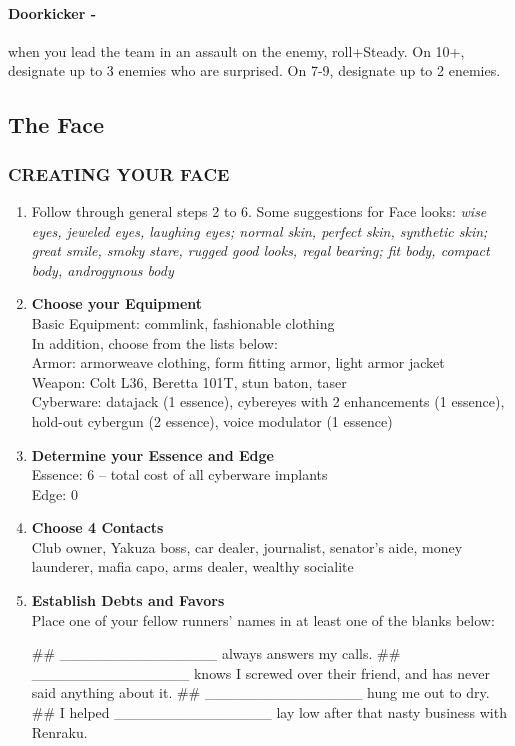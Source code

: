 \paragraph{Doorkicker -} when you lead the team in an assault on the enemy, roll+Steady. On 10+, designate up to 3 enemies who are surprised. On 7-9, designate up to 2 enemies.



\clearpage
\subsection{The Face}
\subsubsection{CREATING YOUR FACE}
\begin{enumerate}
    \item Follow through general steps 2 to 6. Some suggestions for Face looks: \textit{wise eyes, jeweled eyes, laughing eyes; normal skin, perfect skin, synthetic skin; great smile, smoky stare, rugged good looks, regal bearing; fit body, compact body, androgynous body}
    
    \item \textbf{Choose your Equipment} \\
    Basic Equipment: commlink, fashionable clothing \\
    In addition, choose from the lists below: \\
    Armor: armorweave clothing, form fitting armor, light armor jacket \\
    Weapon: Colt L36, Beretta 101T, stun baton, taser \\
    Cyberware: datajack (1 essence), cybereyes with 2 enhancements (1 essence), hold-out cybergun (2 essence), voice modulator (1 essence)
    
    \item \textbf{Determine your Essence and Edge} \\
    Essence: 6 – total cost of all cyberware implants \\
    Edge: 0
    
    \item \textbf{Choose 4 Contacts} \\
    Club owner, Yakuza boss, car dealer, journalist, senator’s aide, money launderer, mafia capo, arms dealer, wealthy socialite
    
    \item \textbf{Establish Debts and Favors} \\
    Place one of your fellow runners’ names in at least one of the blanks below:
        \begin{easylist}
            ## \_\_\_\_\_\_\_\_\_\_\_\_\_\_\_ always answers my calls.
            ## \_\_\_\_\_\_\_\_\_\_\_\_\_\_\_ knows I screwed over their friend, and has never said anything about it.
            ## \_\_\_\_\_\_\_\_\_\_\_\_\_\_\_ hung me out to dry.
            ## I helped \_\_\_\_\_\_\_\_\_\_\_\_\_\_\_ lay low after that nasty business with Renraku.
        \end{easylist}
    

\end{enumerate}

